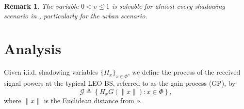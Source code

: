 \documentclass[lettersize,journal]{IEEEtran}
\newcommand{\rEarth}{R_{\oplus}}
\newcommand{\R}{\mathbb{R}}
\newtheorem*{remark}{Remark}
\begin{document}
\begin{remark}
  The variable $0<\upsilon \leq 1$ is solvable for almost every shadowing scenario in \cite{TR38.811}, particularly for the urban scenario.
\end{remark}




\section{Analysis}

         
Given i.i.d. shadowing variables $\{H_x\}_{x \in \Phi}$, we define the process of the received signal powers at the typical LEO BS, referred to as the gain process (GP), by
\begin{equation}
  \label{eq:gainprocess}
  \mathcal{G} \triangleq \left\{ H_x G(\|x\|) : x \in \Phi \right\},
\end{equation}
where $\|x\|$ is the Euclidean distance from $\textit{o}$. 
\end{document}
